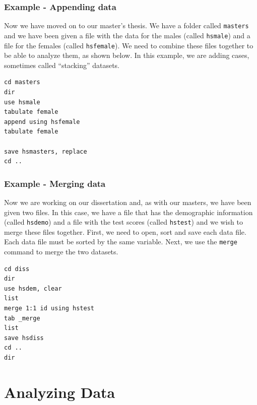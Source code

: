 \documentclass{article}
\begin{document}
\subsubsection{Example - Appending data}

Now we have moved on to our master\rq{}s thesis.  We have a folder called \lstinline{masters} and we have been given a file with the data for the males (called \lstinline{hsmale}) and a file for the females (called \lstinline{hsfemale}).  We need to combine these files together to be able to analyze them, as shown below.  In this example, we are adding cases, sometimes called ``stacking'' datasets.

\begin{lstlisting}
cd masters
dir
use hsmale
tabulate female
append using hsfemale
tabulate female

save hsmasters, replace
cd ..
\end{lstlisting}

\subsubsection{Example - Merging data}

Now we are working on our dissertation and, as with our masters, we have been given two files.  In this case, we have a file that has the demographic information (called \lstinline{hsdemo}) and a file with the test scores (called \lstinline{hstest}) and we wish to merge these files together.  First, we need to open, sort and save each data file.  Each data file must be sorted by the same variable.  Next, we use the \lstinline{merge} command to merge the two datasets.

\begin{lstlisting}
cd diss
dir
use hsdem, clear
list
merge 1:1 id using hstest
tab _merge
list
save hsdiss
cd ..
dir
\end{lstlisting}

\section{Analyzing Data}
\end{document}
